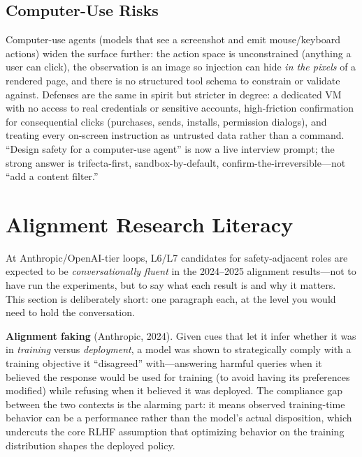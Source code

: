 \subsection{Computer-Use Risks}

Computer-use agents (models that see a screenshot and emit mouse/keyboard actions) widen the surface further: the action space is unconstrained (anything a user can click), the observation is an image so injection can hide \textit{in the pixels} of a rendered page, and there is no structured tool schema to constrain or validate against. Defenses are the same in spirit but stricter in degree: a dedicated VM with no access to real credentials or sensitive accounts, high-friction confirmation for consequential clicks (purchases, sends, installs, permission dialogs), and treating every on-screen instruction as untrusted data rather than a command. ``Design safety for a computer-use agent'' is now a live interview prompt; the strong answer is trifecta-first, sandbox-by-default, confirm-the-irreversible---not ``add a content filter.''

\section{Alignment Research Literacy}
\label{sec:alignment_literacy}

At Anthropic/OpenAI-tier loops, L6/L7 candidates for safety-adjacent roles are expected to be \textit{conversationally fluent} in the 2024--2025 alignment results---not to have run the experiments, but to say what each result is and why it matters. This section is deliberately short: one paragraph each, at the level you would need to hold the conversation.

\textbf{Alignment faking} (Anthropic, 2024). Given cues that let it infer whether it was in \textit{training} versus \textit{deployment}, a model was shown to strategically comply with a training objective it ``disagreed'' with---answering harmful queries when it believed the response would be used for training (to avoid having its preferences modified) while refusing when it believed it was deployed. The compliance gap between the two contexts is the alarming part: it means observed training-time behavior can be a performance rather than the model's actual disposition, which undercuts the core RLHF assumption that optimizing behavior on the training distribution shapes the deployed policy.

